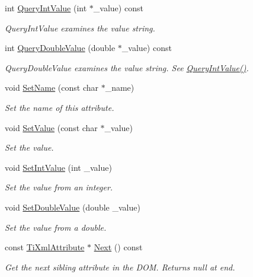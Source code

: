 \begin{DoxyCompactItemize}
\item 
int \hyperlink{class_ti_xml_attribute_ad6c93088ee21af41a107931223339344}{QueryIntValue} (int $\ast$\_\-value) const 
\begin{DoxyCompactList}\small\item\em QueryIntValue examines the value string. \end{DoxyCompactList}\item 
int \hyperlink{class_ti_xml_attribute_ac87b2a8489906a5d7aa2875f20be3513}{QueryDoubleValue} (double $\ast$\_\-value) const 
\begin{DoxyCompactList}\small\item\em QueryDoubleValue examines the value string. See \hyperlink{class_ti_xml_attribute_ad6c93088ee21af41a107931223339344}{QueryIntValue()}. \end{DoxyCompactList}\item 
void \hyperlink{class_ti_xml_attribute_ab7fa3d21ff8d7c5764cf9af15b667a99}{SetName} (const char $\ast$\_\-name)
\begin{DoxyCompactList}\small\item\em Set the name of this attribute. \end{DoxyCompactList}\item 
void \hyperlink{class_ti_xml_attribute_a2dae44178f668b3cb48101be4f2236a0}{SetValue} (const char $\ast$\_\-value)
\begin{DoxyCompactList}\small\item\em Set the value. \end{DoxyCompactList}\item 
void \hyperlink{class_ti_xml_attribute_a7e065df640116a62ea4f4b7da5449cc8}{SetIntValue} (int \_\-value)
\begin{DoxyCompactList}\small\item\em Set the value from an integer. \end{DoxyCompactList}\item 
void \hyperlink{class_ti_xml_attribute_a0316da31373496c4368ad549bf711394}{SetDoubleValue} (double \_\-value)
\begin{DoxyCompactList}\small\item\em Set the value from a double. \end{DoxyCompactList}\item 
const \hyperlink{class_ti_xml_attribute}{TiXmlAttribute} $\ast$ \hyperlink{class_ti_xml_attribute_a776478980776a024f7c2846eec640f65}{Next} () const 
\begin{DoxyCompactList}\small\item\em Get the next sibling attribute in the DOM. Returns null at end. \end{DoxyCompactList}\item 

\end{DoxyCompactItemize}
